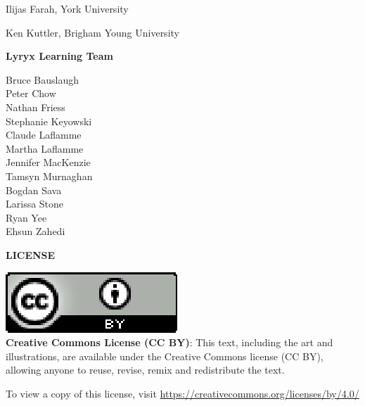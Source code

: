 {\small

\begin{center}
Ilijas Farah, York University
\smallskip

Ken Kuttler, Brigham Young University
\smallskip


\bigskip
\textbf{Lyryx Learning Team}
\vspace{-1em}

\begin{multicols}{2}
Bruce Bauslaugh \\
Peter Chow \\
Nathan Friess \\
Stephanie Keyowski \\
Claude Laflamme \\
Martha Laflamme \\ 
Jennifer MacKenzie \\
Tamsyn Murnaghan \\
Bogdan Sava \\
Larissa Stone \\
Ryan Yee\\
Ehsun Zahedi\\
\end{multicols}
\end{center}

}

\vfill


\begin{center}
\fontsize{14pt}{16pt}\selectfont\textcolor{titletextcolour}{\textbf{LICENSE}}
\end{center}

\begin{center}

\noindent \includegraphics[scale=.8]{figures/cc-by.eps} \\

\noindent \textbf{Creative Commons License (CC BY)}: This text, including the art and illustrations, are available under the Creative Commons license (CC BY), allowing anyone to reuse, revise, remix and redistribute the text.   

\noindent To view a copy of this license, visit \href{https://creativecommons.org/licenses/by/4.0/}{https://creativecommons.org/licenses/by/4.0/}
\end{center}

\setlength{\parskip}{\baselineskip}

